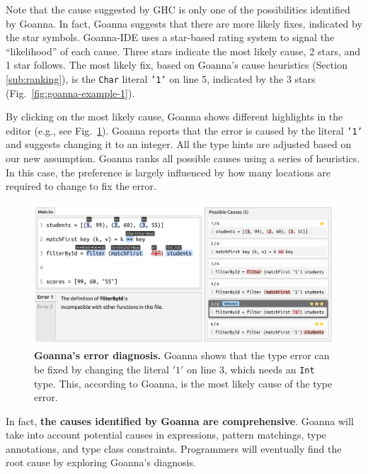 \documentclass[pdflatex,lineno,sn-nature,Numbered]{sn-jnl}%
\begin{document}
    Note that the cause suggested by GHC is only one of the possibilities identified by Goanna. In fact, Goanna suggests that there are more likely fixes, indicated by the star symbols. Goanna-IDE uses a star-based rating system to signal the ``likelihood'' of each cause. Three stars indicate the most likely cause, 2 stars, and 1 star follows.  The most likely fix, based on Goanna's cause heuristics (Section \ref{sub:ranking}), is the \texttt{Char} literal \texttt{'1'} on line 5, indicated by the 3 stars (Fig.~\ref{fig:goanna-example-1}).
    
    By clicking on the most likely cause, Goanna shows different highlights in the editor (e.g., see Fig.~\ref{fig:goanna-example-2}). Goanna reports that the error is caused by the literal \texttt{'1'} and suggests changing it to an integer. All the type hints are adjusted based on our new assumption. Goanna ranks all possible causes using a series of heuristics. In this case, the preference is largely influenced by how many locations are required to change to fix the error. 

    \begin{figure}[ht!]
        \centering
        \includegraphics[width=\linewidth]{images/goanna-example-2.pdf}
        \caption[Goanna's showing possible causes of a type error (2)]{\textbf{Goanna's error diagnosis.} Goanna shows that the type error can be fixed by changing the literal $'1'$ on line 3, which needs an \texttt{Int} type. This, according to Goanna, is the most likely cause of the type error.}
        \label{fig:goanna-example-2}
    \end{figure}

    In fact, {\bf the causes identified by Goanna are comprehensive}. Goanna will take into account potential causes in expressions, pattern matchings, type annotations, and type class constraints. Programmers will eventually find the root cause by exploring Goanna's diagnosis.
\end{document}
